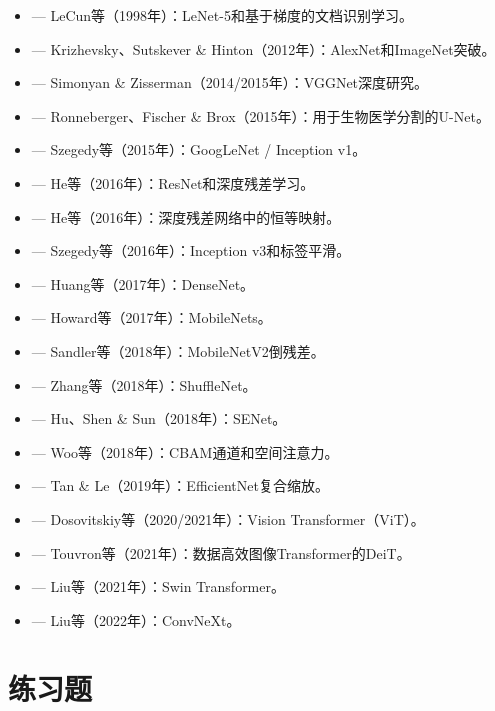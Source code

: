 \begin{itemize}
    \item \cite{lecun1998gradient} --- LeCun等（1998年）：LeNet-5和基于梯度的文档识别学习。
    \item \cite{krizhevsky2012imagenet} --- Krizhevsky、Sutskever \& Hinton（2012年）：AlexNet和ImageNet突破。
    \item \cite{simonyan2014very} --- Simonyan \& Zisserman（2014/2015年）：VGGNet深度研究。
    \item \cite{ronneberger2015u} --- Ronneberger、Fischer \& Brox（2015年）：用于生物医学分割的U-Net。
    \item \cite{szegedy2015going} --- Szegedy等（2015年）：GoogLeNet / Inception v1。
    \item \cite{he2016deep} --- He等（2016年）：ResNet和深度残差学习。
    \item \cite{he2016identity} --- He等（2016年）：深度残差网络中的恒等映射。
    \item \cite{szegedy2016rethinking} --- Szegedy等（2016年）：Inception v3和标签平滑。
    \item \cite{huang2017densely} --- Huang等（2017年）：DenseNet。
    \item \cite{howard2017mobilenets} --- Howard等（2017年）：MobileNets。
    \item \cite{sandler2018mobilenetv2} --- Sandler等（2018年）：MobileNetV2倒残差。
    \item \cite{zhang2018shufflenet} --- Zhang等（2018年）：ShuffleNet。
    \item \cite{hu2018squeeze} --- Hu、Shen \& Sun（2018年）：SENet。
    \item \cite{woo2018cbam} --- Woo等（2018年）：CBAM通道和空间注意力。
    \item \cite{tan2019efficientnet} --- Tan \& Le（2019年）：EfficientNet复合缩放。
    \item \cite{dosovitskiy2020image} --- Dosovitskiy等（2020/2021年）：Vision Transformer（ViT）。
    \item \cite{touvron2021training} --- Touvron等（2021年）：数据高效图像Transformer的DeiT。
    \item \cite{liu2021swin} --- Liu等（2021年）：Swin Transformer。
    \item \cite{liu2022convnet} --- Liu等（2022年）：ConvNeXt。
\end{itemize}

\section{练习题}

